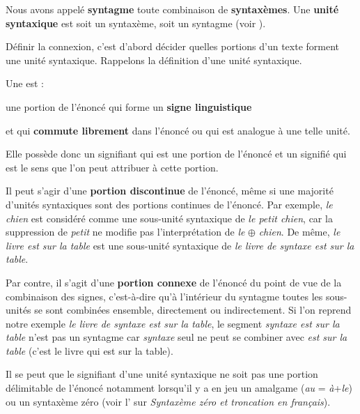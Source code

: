 Nous avons appelé \textbf{syntagme} toute combinaison de \textbf{syntaxèmes}. Une \textbf{unité syntaxique} est soit un syntaxème, soit un syntagme (voir ).

Définir la connexion, c’est d’abord décider quelles portions d’un texte forment une unité syntaxique. Rappelons la définition d’une unité syntaxique.

\begin{styleLivreImportant}
Une  est :

 une portion de l’énoncé qui forme un \textbf{signe linguistique}
\end{styleLivreImportant}

\begin{styleLivreImportant}
   \item et qui \textbf{commute librement} dans l’énoncé ou qui est analogue à une telle unité.
\end{styleLivreImportant}

\begin{styleLivreImportant}
Elle possède donc un signifiant qui est une portion de l’énoncé et un signifié qui est le sens que l’on peut attribuer à cette portion.
\end{styleLivreImportant}

Il peut s’agir d’une \textbf{portion discontinue} de l’énoncé, même si une majorité d’unités syntaxiques sont des portions continues de l’énoncé. Par exemple, \textit{le chien} est considéré comme une sous-unité syntaxique de \textit{le petit chien}, car la suppression de \textit{petit} ne modifie pas l’interprétation de \textit{le} \textbf{${\oplus}$} \textit{chien}. De même, \textit{le livre est sur la table} est une sous-unité syntaxique de \textit{le livre de syntaxe est sur la table}.

Par contre, il s’agit d’une \textbf{portion connexe} de l’énoncé du point de vue de la combinaison des signes, c’est-à-dire qu’à l’intérieur du syntagme toutes les sous-unités se sont combinées ensemble, directement ou indirectement. Si l’on reprend notre exemple \textit{le livre de syntaxe est sur la table}, le segment \textit{syntaxe est sur la table} n’est pas un syntagme car \textit{syntaxe} seul ne peut se combiner avec \textit{est sur la table} (c’est le livre qui est sur la table).

Il se peut que le signifiant d’une unité syntaxique ne soit pas une portion délimitable de l’énoncé notamment lorsqu’il y a en jeu un amalgame (\textit{au} = \textit{à}+\textit{le}) ou un syntaxème zéro (voir l’ sur \textit{Syntaxème zéro et troncation en français}).

